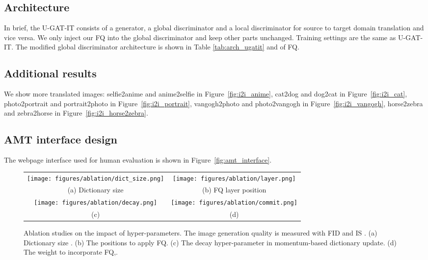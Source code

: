 \documentclass{article}
\begin{document}
\subsection{Architecture}
In brief, the U-GAT-IT consists of a generator, a global discriminator and a local discriminator for source to target domain translation and vice versa. We only inject our FQ into the global discriminator and keep other parts unchanged. Training settings are the same as U-GAT-IT. The modified global discriminator architecture is shown in Table \ref{tab:arch_ugatit} and  of FQ.

\subsection{Additional results}

We show more translated images: selfie2anime and anime2selfie in Figure~\ref{fig:i2i_anime}, cat2dog and dog2cat in Figure~\ref{fig:i2i_cat}, photo2portrait and portrait2photo in Figure~\ref{fig:i2i_portrait}, vangogh2photo and photo2vangogh in Figure~\ref{fig:i2i_vangogh}, horse2zebra and zebra2horse in Figure~\ref{fig:i2i_horse2zebra}.

\subsection{AMT interface design}
The webpage interface used for human evaluation is shown in Figure~\ref{fig:amt_interface}. 


\begin{figure*}[t!]\vspace{-0mm}\centering
	\begin{tabular}{c c}
		\texttt{[image: figures/ablation/dict\_size.png]}  & 
		\texttt{[image: figures/ablation/layer.png]}  \\
		(a) Dictionary size \vspace{0mm} & 
		(b) FQ layer position \hspace{-0mm} \\
		\texttt{[image: figures/ablation/decay.png]}  &
		\texttt{[image: figures/ablation/commit.png]} \\
		(c)  \hspace{0mm} & 
		(d)  \hspace{-0mm} \\ 
	\end{tabular}
	\vspace{-0mm}
	\caption{Ablation studies on the impact of hyper-parameters. The image generation quality is measured with FID  and IS . (a) Dictionary size . (b) The positions to apply FQ. (c) The decay hyper-parameter  in momentum-based dictionary update. (d) The weight  to incorporate FQ,.
	 }
	\vspace{-0mm}
	\label{fig:ablation_sup}
\end{figure*}
\end{document}
